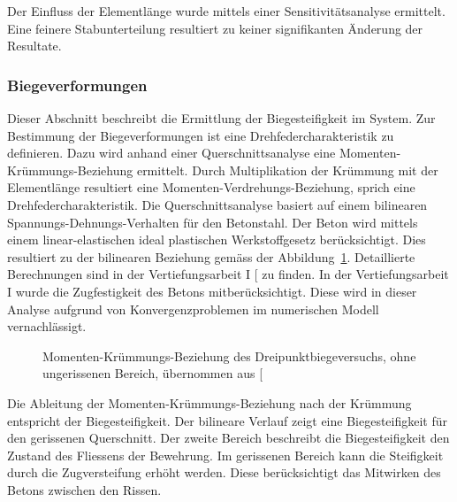 \documentclass[
  11pt,
  letterpaper,
]{scrreprt}
\begin{document}
Der Einfluss der Elementlänge wurde mittels einer Sensitivitätsanalyse
ermittelt. Eine feinere Stabunterteilung resultiert zu keiner
signifikanten Änderung der Resultate.

\subsubsection{Biegeverformungen}\label{biegeverformungen}

Dieser Abschnitt beschreibt die Ermittlung der Biegesteifigkeit im
System. Zur Bestimmung der Biegeverformungen ist eine
Drehfedercharakteristik zu definieren. Dazu wird anhand einer
Querschnittsanalyse eine Momenten-Krümmungs-Beziehung ermittelt. Durch
Multiplikation der Krümmung mit der Elementlänge resultiert eine
Momenten-Verdrehungs-Beziehung, sprich eine Drehfedercharakteristik. Die
Querschnittsanalyse basiert auf einem bilinearen
Spannungs-Dehnungs-Verhalten für den Betonstahl. Der Beton wird mittels
einem linear-elastischen ideal plastischen Werkstoffgesetz
berücksichtigt. Dies resultiert zu der bilinearen Beziehung gemäss der
Abbildung~\ref{fig-mchi_a3v2}. Detaillierte Berechnungen sind in der
Vertiefungsarbeit I {[}\citeproc{ref-gitz_ansatze_2024}{1}{]} zu finden.
In der Vertiefungsarbeit I wurde die Zugfestigkeit des Betons
mitberücksichtigt. Diese wird in dieser Analyse aufgrund von
Konvergenzproblemen im numerischen Modell vernachlässigt.

\begin{figure}[H]


\caption{\label{fig-mchi_a3v2}Momenten-Krümmungs-Beziehung des
Dreipunktbiegeversuchs, ohne ungerissenen Bereich, übernommen aus
{[}\citeproc{ref-gitz_ansatze_2024}{1}{]}}

\end{figure}%

Die Ableitung der Momenten-Krümmungs-Beziehung nach der Krümmung
entspricht der Biegesteifigkeit. Der bilineare Verlauf zeigt eine
Biegesteifigkeit für den gerissenen Querschnitt. Der zweite Bereich
beschreibt die Biegesteifigkeit den Zustand des Fliessens der Bewehrung.
Im gerissenen Bereich kann die Steifigkeit durch die Zugversteifung
erhöht werden. Diese berücksichtigt das Mitwirken des Betons zwischen
den Rissen.
\end{document}
